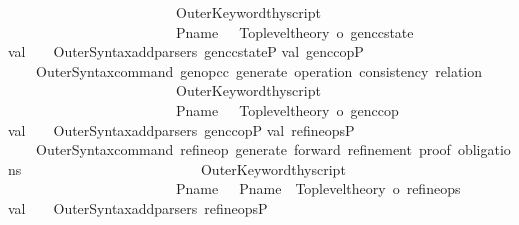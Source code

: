 \begin{isabellebody}
\ \ \ \ \ \ \ \ \ \ \ \ \ \ \ \ \ \ \ \ \ \ \ \ OuterKeyword{\isachardot}thy{\isacharunderscore}script\isanewline
\ \ \ \ \ \ \ \ \ \ \ \ \ \ \ \ \ \ \ \ \ \ \ \ {\isacharparenleft}{\isacharparenleft}P{\isachardot}name{\isacharparenright}\ \ {\isachargreater}{\isachargreater}\ {\isacharparenleft}Toplevel{\isachardot}theory\ o\ gen{\isacharunderscore}cc{\isacharunderscore}state{\isacharparenright}{\isacharparenright}{\isacharsemicolon}\isanewline
val\ {\isacharunderscore}\ {\isacharequal}\ \ OuterSyntax{\isachardot}add{\isacharunderscore}parsers\ {\isacharbrackleft}gen{\isacharunderscore}cc{\isacharunderscore}stateP{\isacharbrackright}{\isacharsemicolon}\isanewline
\isanewline
\isanewline
val\ gen{\isacharunderscore}cc{\isacharunderscore}opP\ {\isacharequal}\isanewline
\ \ \ \ OuterSyntax{\isachardot}command\ {\isachardoublequote}gen{\isacharunderscore}op{\isacharunderscore}cc{\isachardoublequote}\ {\isachardoublequote}generate\ operation\ consistency\ relation{\isachardoublequote}\ \isanewline
\ \ \ \ \ \ \ \ \ \ \ \ \ \ \ \ \ \ \ \ \ \ \ \ OuterKeyword{\isachardot}thy{\isacharunderscore}script\isanewline
\ \ \ \ \ \ \ \ \ \ \ \ \ \ \ \ \ \ \ \ \ \ \ \ {\isacharparenleft}{\isacharparenleft}P{\isachardot}name{\isacharparenright}\ \ {\isachargreater}{\isachargreater}\ {\isacharparenleft}Toplevel{\isachardot}theory\ o\ gen{\isacharunderscore}cc{\isacharunderscore}op{\isacharparenright}{\isacharparenright}{\isacharsemicolon}\isanewline
val\ {\isacharunderscore}\ {\isacharequal}\ \ OuterSyntax{\isachardot}add{\isacharunderscore}parsers\ {\isacharbrackleft}gen{\isacharunderscore}cc{\isacharunderscore}opP{\isacharbrackright}{\isacharsemicolon}\isanewline
\isanewline
\isanewline
val\ refine{\isacharunderscore}opsP\ {\isacharequal}\isanewline
\ \ \ \ OuterSyntax{\isachardot}command\ {\isachardoublequote}refine{\isacharunderscore}op{\isachardoublequote}\ {\isachardoublequote}generate\ forward\ refinement\ proof\ obligations{\isachardoublequote}\ \isanewline
\ \ \ \ \ \ \ \ \ \ \ \ \ \ \ \ \ \ \ \ \ \ \ \ OuterKeyword{\isachardot}thy{\isacharunderscore}script\isanewline
\ \ \ \ \ \ \ \ \ \ \ \ \ \ \ \ \ \ \ \ \ \ \ \ {\isacharparenleft}{\isacharparenleft}P{\isachardot}name{\isacharparenright}\ \ {\isacharminus}{\isacharminus}\ {\isacharparenleft}P{\isachardot}name{\isacharparenright}\ {\isachargreater}{\isachargreater}\ {\isacharparenleft}Toplevel{\isachardot}theory\ o\ refine{\isacharunderscore}ops{\isacharparenright}{\isacharparenright}{\isacharsemicolon}\isanewline
val\ {\isacharunderscore}\ {\isacharequal}\ \ OuterSyntax{\isachardot}add{\isacharunderscore}parsers\ {\isacharbrackleft}refine{\isacharunderscore}opsP{\isacharbrackright}{\isacharsemicolon}\isanewline

\end{isabellebody}
